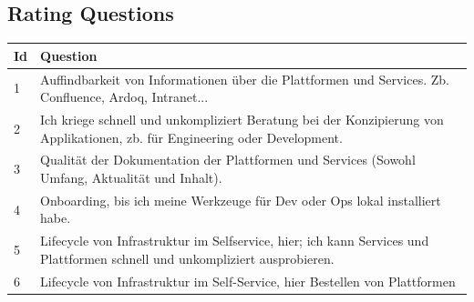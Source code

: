 \documentclass[a4paper,12pt]{article}
\begin{document}
    \subsection{Rating Questions}
    \label{subsec:rating}
    \begin{table}[!htbp]
        \begin{center}
            \begin{tabularx}{\textwidth}{lX}
                \toprule
                Id & Question                                                                                                                                                                                                                                                    \\
                \midrule
                1  & Auffindbarkeit von Informationen über die Plattformen und Services. Zb. Confluence, Ardoq, Intranet...                                                                                                                                                      \\
                2  & Ich kriege schnell und unkompliziert Beratung bei der Konzipierung von Applikationen, zb. für Engineering oder Development.                                                                                                                                 \\
                3  & Qualität der Dokumentation der Plattformen und Services (Sowohl Umfang, Aktualität und Inhalt).                                                                                                                                                             \\
                4  & Onboarding, bis ich meine Werkzeuge für Dev oder Ops lokal installiert habe.                                                                                                                                                                                \\
                5  & Lifecycle von Infrastruktur im Selfservice, hier; ich kann Services und Plattformen schnell und unkompliziert ausprobieren.                                                                                                                                 \\
                6  & Lifecycle von Infrastruktur im Self-Service, hier Bestellen von Plattformen                                                                                                                                                                                 \\

\end{tabularx}
\end{center}
\end{table}
\end{document}

